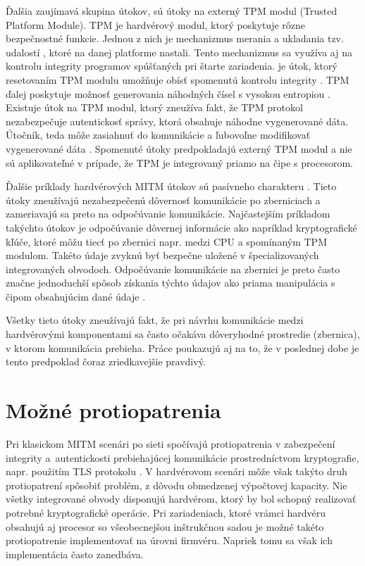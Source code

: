 Ďalšia zaujímavá skupina útokov, sú útoky na externý TPM modul (Trusted Platform Module). TPM je hardvérový modul, ktorý poskytuje rôzne bezpečnostné funkcie. Jednou z nich je mechanizmus merania a ukladania tzv. udalostí \cite{tpmArch}, ktoré na danej platforme nastali. Tento mechanizmus sa využíva aj na kontrolu integrity programov spúšťaných pri štarte zariadenia.  je útok, ktorý resetovaním TPM modulu umožňuje obísť spomenutú kontrolu integrity \cite{mitmTPM}. TPM ďalej poskytuje možnosť generovania náhodných čísel s vysokou entropiou \cite{tpmArch}. Existuje útok na TPM modul, ktorý zneužíva fakt, že TPM protokol nezabezpečuje autentickosť správy, ktorá obsahuje náhodne vygenerované dáta. Útočník, teda môže zasiahnuť do komunikácie a ľubovoľne modifikovať vygenerované dáta \cite{mitmTPM}. Spomenuté útoky predpokladajú externý TPM modul a nie sú aplikovateľné v prípade, že TPM je integrovaný priamo na čipe s procesorom.

Ďalšie príklady hardvérových MITM útokov sú pasívneho charakteru \cite{mitmI2C, mitmBitlocker}. Tieto útoky zneužívajú nezabezpečenú dôvernosť komunikácie po zberniciach a zameriavajú sa preto na odpočúvanie komunikácie. Najčastejším príkladom takýchto útokov je odpočúvanie dôvernej informácie ako napríklad kryptografické kľúče, ktoré môžu tiecť po zbernici napr. medzi CPU a spomínaným TPM modulom. Takéto údaje zvyknú byť bezpečne uložené v špecializovaných integrovaných obvodoch. Odpočúvanie komunikácie na zbernici je preto často značne jednoduchší spôsob získania týchto údajov ako priama manipulácia s čipom obsahujúcim dané údaje \cite{mitmBitlocker}.

Všetky tieto útoky zneužívajú fakt, že pri návrhu komunikácie medzi hardvérovými komponentami sa často očakáva dôveryhodné prostredie (zbernica), v ktorom komunikácia prebieha. Práce poukazujú aj na to, že v poslednej dobe je tento predpoklad čoraz zriedkavejšie pravdivý.

\section{Možné protiopatrenia}
Pri klasickom MITM scenári po sieti spočívajú protiopatrenia v zabezpečení integrity a~autentickosti prebiehajúcej komunikácie prostredníctvom kryptografie, napr. použitím TLS protokolu \cite{mitmTheory}. V hardvérovom scenári môže však takýto druh protiopatrení spôsobiť problém, z dôvodu obmedzenej výpočtovej kapacity. Nie všetky integrované obvody disponujú hardvérom, ktorý by bol schopný realizovať potrebné kryptografické operácie. Pri zariadeniach, ktoré vrámci hardvéru obsahujú aj procesor so všeobecnejšou inštrukčnou sadou je možné takéto protiopatrenie implementovať na úrovni firmvéru. Napriek tomu sa však ich implementácia často zanedbáva.

